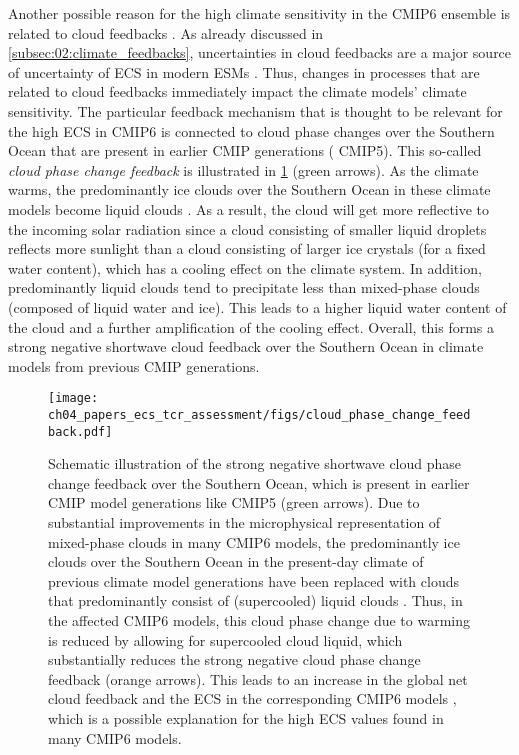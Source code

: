 Another possible reason for the high climate sensitivity in the \acs{CMIP}6
ensemble is related to cloud feedbacks \autocite{Bock2020}. As already
discussed in \cref{subsec:02:climate_feedbacks}, uncertainties in cloud
feedbacks are a major source of uncertainty of \ac{ECS} in modern \acp{ESM}
\autocite{Boucher2013, Flato2013}. Thus, changes in processes that are related
to cloud feedbacks immediately impact the climate models' climate sensitivity.
The particular feedback mechanism that is thought to be relevant for the high
\ac{ECS} in \acs{CMIP}6 is connected to cloud phase changes over the Southern
Ocean that are present in earlier \ac{CMIP} generations (\eg{} \acs{CMIP}5).
This so-called \emph{cloud phase change feedback} is illustrated in
\cref{fig:04:cloud_phase_change_feedback} (green arrows). As the climate warms,
the predominantly ice clouds over the Southern Ocean in these climate models
become liquid clouds \autocite{McCoy2015}. As a result, the cloud will get more
reflective to the incoming solar radiation since a cloud consisting of smaller
liquid droplets reflects more sunlight than a cloud consisting of larger ice
crystals (for a fixed water content), which has a cooling effect on the climate
system. In addition, predominantly liquid clouds tend to precipitate less than
mixed-phase clouds (composed of liquid water and ice). This leads to a higher
liquid water content of the cloud and a further amplification of the cooling
effect. Overall, this forms a strong negative shortwave cloud feedback over the
Southern Ocean in climate models from previous \ac{CMIP} generations.

\begin{figure}[t]
  \centering
  \texttt{[image: 
    ch04\_papers\_ecs\_tcr\_assessment/figs/cloud\_phase\_change\_feedback.pdf]}
  \caption[
    Schematic illustration of the strong negative shortwave cloud phase change
    feedback over the Southern Ocean.
  ]{
    Schematic illustration of the strong negative shortwave cloud phase change
    feedback over the Southern Ocean, which is present in earlier \acs{CMIP}
    model generations like \acs{CMIP}5 (green arrows). Due to substantial
    improvements in the microphysical representation of mixed-phase clouds in
    many \acs{CMIP}6 models, the predominantly ice clouds over the Southern
    Ocean in the present-day climate of previous climate model generations have
    been replaced with clouds that predominantly consist of (supercooled)
    liquid clouds \autocite{BodasSalcedo2019, Gettelman2019}. Thus, in the
    affected \acs{CMIP}6 models, this cloud phase change due to warming is
    reduced by allowing for supercooled cloud liquid, which substantially
    reduces the strong negative cloud phase change feedback (orange arrows).
    This leads to an increase in the global net cloud feedback
    \autocite{BodasSalcedo2019, Tan2016} and the \acf{ECS} in the corresponding
    \acs{CMIP}6 models \autocite{Andrews2019, Gettelman2019}, which is a
    possible explanation for the high \acs{ECS} values found in many
    \acs{CMIP}6 models.
  }
  \label{fig:04:cloud_phase_change_feedback}
\end{figure}

